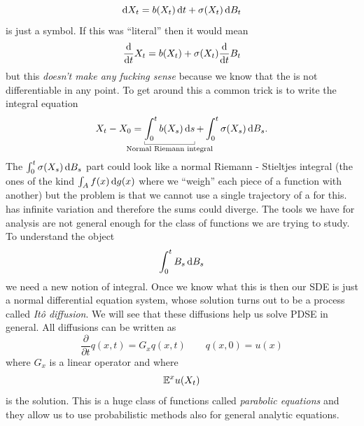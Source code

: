 \documentclass[12pt]{report}
\begin{document}
\begin{equation*}
	\mathop{}\!\mathrm{d} X_{t}=b(X_{t})\mathop{}\!\mathrm{d} t+\sigma(X_{t})\mathop{}\!\mathrm{d} B_{t}
\end{equation*}
is just a symbol. If this was ``literal'' then it would mean
\begin{equation*}
	\frac{\mathop{}\!\mathrm{d}}{\mathop{}\!\mathrm{d} t}X_{t}=b(X_{t})+\sigma(X_{t})\frac{\mathop{}\!\mathrm{d}}{\mathop{}\!\mathrm{d} t}B_{t}
\end{equation*}
but this \emph{doesn't make any fucking sense} because we know that the \bwm{} is not differentiable in any point. To get around this a common trick is to write the integral equation
\begin{equation*}
	X_{t}-X_{0}=\ubracketthin{\int_{0}^{t}b(X_{s})\ds}_{\claptext{Normal Riemann integral}}+\int_{0}^{t}\sigma(X_{s})\dif B_{s}.
\end{equation*}
The $\int_{0}^{t}\sigma(X_{s})\mathop{}\!\mathrm{d} B_{s}$ part could look like a normal Riemann - Stieltjes integral (the ones of the kind $\int_{A}f(x)\mathop{}\!\mathrm{d} g(x)$ where we ``weigh'' each piece of a function with another) but the problem is that we cannot use a single trajectory of a \bwm{} for this. \bwm{} has infinite variation and therefore the sums could diverge. The tools we have for analysis are not general enough for the class of functions we are trying to study. To understand the object
\begin{equation*}
	\int_{0}^{t}B_{s}\mathop{}\!\mathrm{d} B_{s}
\end{equation*}
we need a new notion of integral. Once we know what this is then our SDE is just a normal differential equation system, whose solution turns out to be a process called \emph{Itô diffusion}. We will see that these diffusions help us solve PDSE in general. All \ito{} diffusions can be written as
\begin{equation*}
	\frac{\partial}{\partial t}q(x,t)=G_{x}q(x,t)\qquad q(x,0)=u(x)
\end{equation*}
where $G_{x}$ is a linear operator and where 
\begin{equation*}
	\mathbb{E}^{x}u(X_{t}) 
\end{equation*}
is the solution. This is a huge class of functions called \textit{parabolic equations} and they allow us to use probabilistic methods also for general analytic equations.
\end{document}
